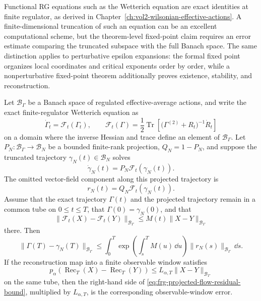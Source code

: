 Functional RG equations such as the Wetterich equation are exact identities
at finite regulator, as derived in
Chapter~\ref{ch:vol2-wilsonian-effective-actions}.  A finite-dimensional
truncation of such an equation can be an excellent computational scheme, but
the theorem-level fixed-point claim requires an error estimate comparing the
truncated subspace with the full Banach space.  The same distinction applies
to perturbative epsilon expansions: the formal fixed point organizes local
coordinates and critical exponents order by order, while a nonperturbative
fixed-point theorem additionally proves existence, stability, and
reconstruction.

\begin{controlledapproximation}
\label{cap:functional-rg-truncation-projected-flow}
Let \(\mathcal B_\Gamma\) be a Banach space of regulated effective-average
actions, and write the exact finite-regulator Wetterich equation as
\[
  \dot\Gamma_t=\mathcal F_t(\Gamma_t),
  \qquad
  \mathcal F_t(\Gamma)
  =
  \frac12\operatorname{Tr}\!\left[
    \bigl(\Gamma^{(2)}+R_t\bigr)^{-1}\dot R_t
  \right]
\]
on a domain where the inverse Hessian and trace define an element of
\(\mathcal B_\Gamma\).  Let \(P_N:\mathcal B_\Gamma\to\mathcal B_N\) be a
bounded finite-rank projection, \(Q_N=1-P_N\), and suppose the truncated
trajectory \(\gamma_N(t)\in\mathcal B_N\) solves
\begin{equation}
  \dot\gamma_N(t)=P_N\mathcal F_t(\gamma_N(t)).
  \label{eq:frg-projected-flow-equation}
\end{equation}
The omitted vector-field component along this projected trajectory is
\begin{equation}
  r_N(t)=Q_N\mathcal F_t(\gamma_N(t)).
  \label{eq:frg-projected-flow-residual}
\end{equation}
Assume that the exact trajectory \(\Gamma(t)\) and the projected trajectory
remain in a common tube on \(0\le t\le T\), that
\(\Gamma(0)=\gamma_N(0)\), and that
\[
  \|\mathcal F_t(X)-\mathcal F_t(Y)\|_{\mathcal B_\Gamma}
  \le M(t)\|X-Y\|_{\mathcal B_\Gamma}
\]
there.  Then
\begin{equation}
  \|\Gamma(T)-\gamma_N(T)\|_{\mathcal B_\Gamma}
  \le
  \int_0^T
  \exp\!\left(\int_s^T M(u)\,\dd u\right)
  \|r_N(s)\|_{\mathcal B_\Gamma}\,\dd s .
  \label{eq:frg-projected-flow-residual-bound}
\end{equation}
If the reconstruction map into a finite observable window satisfies
\[
  p_\alpha(\operatorname{Rec}_T(X)-\operatorname{Rec}_T(Y))
  \le L_{\alpha,T}\|X-Y\|_{\mathcal B_\Gamma}
\]
on the same tube, then the right-hand side of
\eqref{eq:frg-projected-flow-residual-bound}, multiplied by
\(L_{\alpha,T}\), is the corresponding observable-window error.
\end{controlledapproximation}

